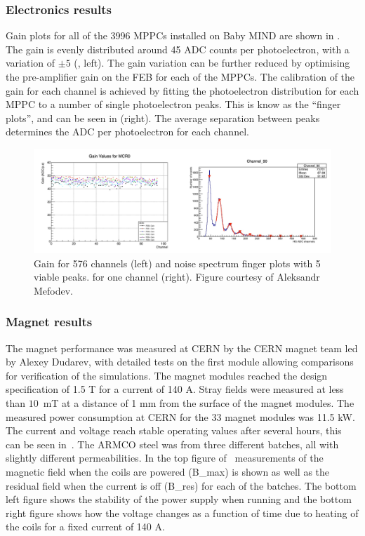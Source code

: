 \subsubsection{Electronics results}

Gain plots for all of the 3996 MPPCs installed on Baby MIND are shown in . The gain is evenly distributed around 45 ADC counts per photoelectron, with a variation of $\pm 5$ (, left). The gain variation can be further reduced by optimising the pre-amplifier gain on the FEB for each of the MPPCs. The calibration of the gain for each channel is achieved by fitting the photoelectron distribution for each MPPC to a number of single photoelectron peaks. This is know as the ``finger plots'', and can be seen in  (right). The average separation between peaks determines the ADC per photoelectron for each channel.

\begin{figure}[h!]
\centering
\includegraphics[width=\textwidth]{figures/mppcplot1.jpeg}
\caption{Gain for 576 channels (left) and noise spectrum finger plots with 5 viable peaks.
 for one channel (right). Figure courtesy of Aleksandr Mefodev.}
\label{fig:MPPCplot1}
\end{figure}

\subsubsection{Magnet results}

The magnet performance was measured at CERN by the CERN magnet team led by Alexey Dudarev, with detailed tests on the first module allowing comparisons for verification of the simulations. The magnet modules reached the design specification of 1.5 T for a current of 140 A. Stray fields were measured at less than $10$~mT at a distance of 1 mm from the surface of the magnet modules. The measured power consumption at CERN for the 33 magnet modules was 11.5 kW. %
The current and voltage reach stable operating values after several hours, this can be seen in~. The ARMCO steel was from three different batches, all with slightly different permeabilities. In the top figure of~ measurements of the magnetic field when the coils are powered (B\_max) is shown as well as the residual field when the current is off (B\_res) for each of the batches. The bottom left figure shows the stability of the power supply when running and the bottom right figure shows how the voltage changes as a function of time due to heating of the coils for a fixed current of 140 A.

